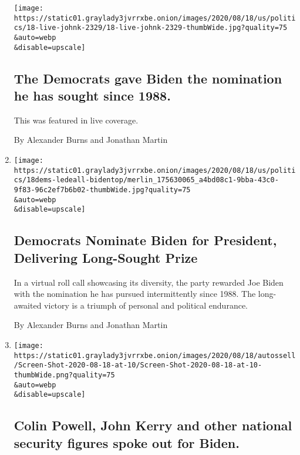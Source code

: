 \begin{enumerate}
  \texttt{[image: https://static01.graylady3jvrrxbe.onion/images/2020/08/18/us/politics/18-live-johnk-2329/18-live-johnk-2329-thumbWide.jpg?quality=75\\\&auto=webp\\\&disable=upscale]}

  \hypertarget{the-democrats-gave-biden-the-nomination-he-has-sought-since-1988-1}{%
  \subsection{The Democrats gave Biden the nomination he has sought
  since
  1988.}\label{the-democrats-gave-biden-the-nomination-he-has-sought-since-1988-1}}

  This was featured in live coverage.

  By Alexander Burns and Jonathan Martin
\item
  \href{/2020/08/18/us/politics/biden-dnc.html}{}

  \texttt{[image: https://static01.graylady3jvrrxbe.onion/images/2020/08/18/us/politics/18dems-ledeall-bidentop/merlin\_175630065\_a4bd08c1-9bba-43c0-9f83-96c2ef7b6b02-thumbWide.jpg?quality=75\\\&auto=webp\\\&disable=upscale]}

  \hypertarget{democrats-nominate-biden-for-president-delivering-long-sought-prize}{%
  \subsection{Democrats Nominate Biden for President, Delivering
  Long-Sought
  Prize}\label{democrats-nominate-biden-for-president-delivering-long-sought-prize}}

  In a virtual roll call showcasing its diversity, the party rewarded
  Joe Biden with the nomination he has pursued intermittently since
  1988. The long-awaited victory is a triumph of personal and political
  endurance.

  By Alexander Burns and Jonathan Martin
\item
  \href{/live/2020/08/18/us/dnc-convention-election/colin-powell-john-kerry-and-other-national-security-figures-spoke-out-for-biden}{}

  \texttt{[image: https://static01.graylady3jvrrxbe.onion/images/2020/08/18/autossell/Screen-Shot-2020-08-18-at-10/Screen-Shot-2020-08-18-at-10-thumbWide.png?quality=75\\\&auto=webp\\\&disable=upscale]}

  \hypertarget{colin-powell-john-kerry-and-other-national-security-figures-spoke-out-for-biden}{%
  \subsection{Colin Powell, John Kerry and other national security
  figures spoke out for
  Biden.}\label{colin-powell-john-kerry-and-other-national-security-figures-spoke-out-for-biden}}


\end{enumerate}
